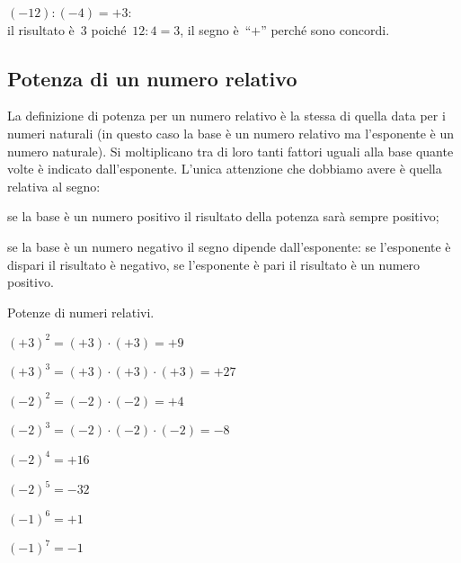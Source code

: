\begin{esempio}
\((-12):(-4)=+3\): \\
il risultato è~3 poiché~\(12:4=3\), il segno è~``\(+\)'' perché sono 
concordi.
 \end{esempio}



\subsection{Potenza di un numero relativo}

La definizione di potenza per un numero relativo è la stessa di quella data 
per 
i numeri naturali
(in questo caso la base è un numero relativo ma l'esponente è un numero 
naturale).
Si moltiplicano tra di loro tanti fattori uguali alla base quante volte è 
indicato dall'esponente.
L'unica attenzione che dobbiamo avere è quella relativa al segno:
 \begin{itemize*}
 \item se la base è un numero positivo il risultato della potenza sarà 
sempre 
positivo;
 \item se la base è un numero negativo il segno dipende dall'esponente: se 
l'esponente è dispari il
risultato è negativo, se l'esponente è pari il risultato è un numero 
positivo.
 \end{itemize*}

 \begin{esempio}
 Potenze di numeri relativi.
 \begin{multicols}{2}
 \begin{itemize*}
 \item \((+3)^2=(+3)\cdot(+3)=+9\)
 \item \((+3)^3=(+3)\cdot(+3)\cdot(+3)=+27\)
 \item \((-2)^2=(-2)\cdot(-2)=+4\)
 \item \((-2)^3=(-2)\cdot(-2)\cdot(-2)=-8\)
 \item \((-2)^4=+16\)
 \item \((-2)^5=-32\)
 \item \((-1)^6=+1\)
 \item \((-1)^7=-1\)
 \end{itemize*}
\end{multicols}
 \end{esempio}

